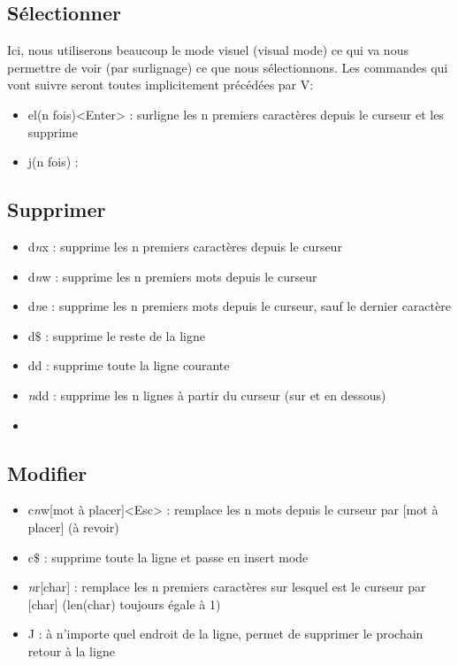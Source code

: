 \documentclass{article}
\begin{document}
\subsection{Sélectionner}
Ici, nous utiliserons beaucoup le mode visuel (visual mode) ce qui va nous permettre de voir (par surlignage) ce que nous sélectionnons. Les commandes qui vont suivre seront toutes implicitement précédées par V:
\begin{itemize}
    \item el(n fois)<Enter> : surligne les n premiers caractères depuis le curseur et les supprime
    \item j(n fois) : 
\end{itemize}





\subsection{Supprimer}
\begin{itemize}
    \item d\textit{n}x : supprime les n premiers caractères depuis le curseur
    \item d\textit{n}w : supprime les n premiers mots depuis le curseur
    \item d\textit{n}e : supprime les n premiers mots depuis le curseur, sauf le dernier caractère
    \item d$\$$ : supprime le reste de la ligne
    \item dd : supprime toute la ligne courante
    \item \textit{n}dd : supprime les n lignes à partir du curseur (sur et en dessous)
    \item 
\end{itemize}
\subsection{Modifier}
\begin{itemize}
    \item c\textit{n}w[mot à placer]<Esc> : remplace les n mots depuis le curseur par [mot à placer] (à revoir)
    \item c$\$$ : supprime toute la ligne et passe en insert mode
    \item \textit{n}r[char] : remplace les n premiers caractères sur lesquel est le curseur par [char] (len(char) toujours égale à 1)
    \item J : à n'importe quel endroit de la ligne, permet de supprimer le prochain retour à la ligne
\end{itemize}
\end{document}
